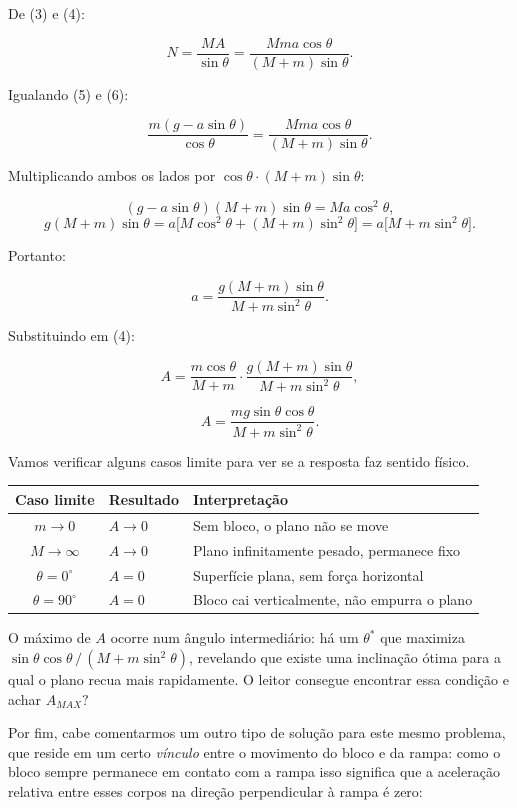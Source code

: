 \begin{exemplo}
De (3) e (4):

\[
  N = \frac{MA}{\sin\theta} = \frac{Mma\cos\theta}{(M+m)\sin\theta}. \tag{6}
\]

Igualando (5) e (6):

\[
  \frac{m(g - a\sin\theta)}{\cos\theta}
  = \frac{Mma\cos\theta}{(M+m)\sin\theta}.
\]

Multiplicando ambos os lados por $\cos\theta\cdot(M+m)\sin\theta$:

\[
  (g - a\sin\theta)(M+m)\sin\theta = Ma\cos^2\theta,
\]
\[
  g(M+m)\sin\theta
  = a\bigl[M\cos^2\theta + (M+m)\sin^2\theta\bigr]
  = a\bigl[M + m\sin^2\theta\bigr].
\]

Portanto:

\[
  a = \frac{g(M+m)\sin\theta}{M + m\sin^2\theta}.
\]

Substituindo em (4):

\[
  A = \frac{m\cos\theta}{M+m}
    \cdot \frac{g(M+m)\sin\theta}{M + m\sin^2\theta},
\]

\[
  \boxed{A = \frac{mg\sin\theta\cos\theta}{M + m\sin^2\theta}.}
\]

\medskip

Vamos verificar alguns casos limite para ver se a resposta faz sentido físico.

\begin{center}
\begin{tabular}{cll}
\toprule
\textbf{Caso limite} & \textbf{Resultado} & \textbf{Interpretação} \\
\midrule
$m \to 0$      & $A \to 0$ & Sem bloco, o plano não se move \\
$M \to \infty$ & $A \to 0$ & Plano infinitamente pesado, permanece fixo \\
$\theta = 0^\circ$  & $A = 0$   & Superfície plana, sem força horizontal \\
$\theta = 90^\circ$ & $A = 0$   & Bloco cai verticalmente, não empurra o plano \\
\bottomrule
\end{tabular}
\end{center}

\noindent O máximo de $A$ ocorre num ângulo intermediário: há um
$\theta^*$ que maximiza $\sin\theta\cos\theta\,/\,(M + m\sin^2\theta)$,
revelando que existe uma inclinação ótima para a qual o plano recua
mais rapidamente. O leitor consegue encontrar essa condição e achar $A_{MAX}?$

\medskip

Por fim, cabe comentarmos um outro tipo de solução para este mesmo problema, que reside em um certo \emph{vínculo} entre o movimento do bloco e da rampa: como o bloco sempre permanece em contato com a rampa isso significa que a aceleração relativa entre esses corpos na direção perpendicular à rampa é zero:



\end{exemplo}
